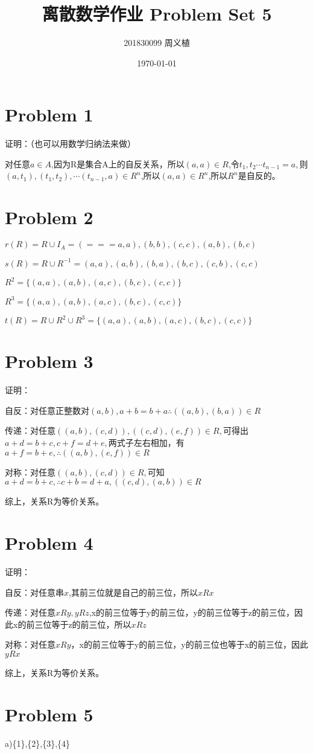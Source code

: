\documentclass{article}
\title{离散数学作业 Problem Set 5}
\author{201830099 周义植}
\date{\today}
\begin{document}
\maketitle
\section*{Problem 1}
证明：（也可以用数学归纳法来做）

对任意$a\in A$,因为R是集合A上的自反关系，所以$(a,a)\in R$,令$t_{1},t_{2}\cdots t_{n-1} = a,$则$(a,t_{1}),(t_{1},t_{2}),\cdots (t_{n-1},a)\in R^{n}$,所以$(a,a)\in R^{n}$,所以$R^{n}$是自反的。

\section*{Problem 2}
$r(R) = R\cup I_{A} = {(===a,a),(b,b),(c,c),(a,b),(b,c)}$

$s(R) = R\cup R^{-1} = {(a,a),(a,b),(b,a),(b,c),(c,b),(c,c)}$

$R^{2} = \{(a,a),(a,b),(a,c),(b,c),(c,c)\}$

$R^{3} = \{(a,a),(a,b),(a,c),(b,c),(c,c)\}$

$t(R) = R\cup R^{2}\cup R^{3} = \{(a,a),(a,b),(a,c),(b,c),(c,c)\}$

\section*{Problem 3}
证明：


自反：对任意正整数对$(a,b),a+b=b+a\therefore ((a,b),(b,a))\in R$

传递：对任意$((a,b),(c,d)),((c,d),(e,f))\in R,$可得出$a+d=b+c,c+f=d+e,$两式子左右相加，有$a+f=b+e,\therefore ((a,b),(e,f))\in R$

对称：对任意$((a,b),(c,d))\in R,$可知$a+d=b+c,\therefore c+b=d+a,((c,d),(a,b))\in R$

综上，关系R为等价关系。
\section*{Problem 4}
证明：

自反：对任意串$x$,其前三位就是自己的前三位，所以$xRx$

传递：对任意$xRy,yRz$,x的前三位等于y的前三位，y的前三位等于z的前三位，因此x的前三位等于z的前三位，所以$xRz$

对称：对任意$xRy$，x的前三位等于y的前三位，y的前三位也等于x的前三位，因此$yRx$

综上，关系R为等价关系。
\section*{Problem 5}
a)\{1\},\{2\},\{3\},\{4\}
\end{document}
